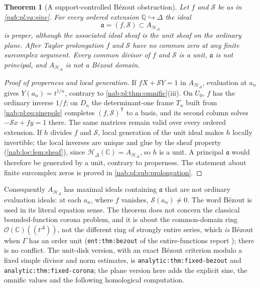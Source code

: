 \documentclass[11pt,letterpaper]{article}
\newtheorem{theorem}{Theorem}[section]
\theoremstyle{definition}
\theoremstyle{remark}
\newcommand{\C}{\mathbb C}
\newcommand{\Q}{\mathbb Q}
\newcommand{\OO}{\mathcal O}
\newcommand{\HD}{\mathscr H_\Delta}
\numberwithin{equation}{section}
\begin{document}
\begin{theorem}[A support-controlled B\'ezout obstruction]\label{nab:pl:thm:bezout}
Let $f$ and $\mathcal S$ be as in \eqref{nab:pl:eq:sine}. For every ordered
extension $\Q\hookrightarrow\Delta$ the ideal
\begin{equation}\label{nab:pl:eq:properideal}
 \mathfrak a=(f,\mathcal S)\subset A_{\HD}
\end{equation}
is proper, although the associated ideal sheaf is the unit sheaf on the
ordinary plane. After Taylor prolongation $f$ and $\mathcal S$ have no common
zero at any finite surcomplex argument. Every common divisor of $f$ and
$\mathcal S$ is a unit, $\mathfrak a$ is not principal, and $A_{\HD}$ is not a
B\'ezout domain.
\end{theorem}

\begin{proof}[Proof of properness and local generation]
If $fX+\mathcal SY=1$ in $A_{\HD}$, evaluation at $a_n$ gives $Y(a_n)=t^{1/n}$,
contrary to \cref{nab:pl:thm:omnific}(iii). On $U_0$, $f$ has the ordinary
inverse $1/f$; on $D_n$ the determinant-one frame $T_n$ built from
\eqref{nab:pl:eq:sinepole} completes $(f,\mathcal S)^{\mathsf T}$ to a basis,
and its second column solves $-\mathcal Sx+fy=1$ there. The same matrices
remain valid over every ordered extension. If $h$ divides $f$ and
$\mathcal S$, local generation of the unit ideal makes $h$ locally invertible;
the local inverses are unique and glue by the sheaf property
(\cref{nab:loc:lem:sheaf}), since $\HD(\C)=A_{\HD}$, so $h$ is a unit. A
principal $\mathfrak a$ would therefore be generated by a unit, contrary to
properness. The statement about finite surcomplex zeros is proved in
\cref{nab:pl:sub:prolongation}.
\end{proof}

Consequently $A_{\HD}$ has maximal ideals containing $\mathfrak a$ that are not
ordinary evaluation ideals: at each $a_n$, where $f$ vanishes,
$\mathcal S(a_n)\neq0$. The word B\'ezout is used in its literal equation
sense. The theorem does not concern the classical bounded-function corona
problem, and it is about the common-domain ring $\OO(\C)((t^\Delta))$, not the
different ring of strongly entire series, which \emph{is} B\'ezout when
$\Gamma$ has an order unit (\nolinkurl{ent:thm:bezout} of the entire-functions
report \cite{RepoEntire}); there is no conflict. The unit-disk version, with
an exact B\'ezout criterion modulo a fixed simple divisor and norm estimates,
is \nolinkurl{analytic:thm:fixed-bezout} and \nolinkurl{analytic:thm:fixed-corona};
the plane version here adds the explicit sine, the omnific values and the
following homological computation.
\end{document}
